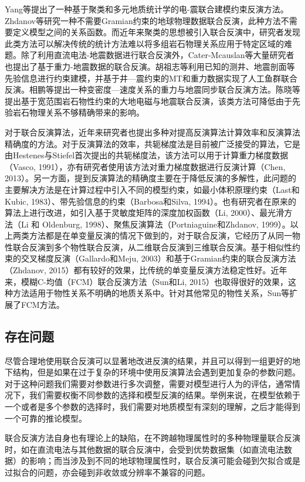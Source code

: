 Yang等提出了一种基于聚类和多元地质统计学的电-震联合建模约束反演方法。Zhdanov等研究一种不需要Gramian约束的地球物理数据联合反演，此种方法不需要定义模型之间的关系函数。而近年来聚类的思想被引入联合反演中，研究者发现此类方法可以解决传统的统计方法难以将多组岩石物理关系应用于特定区域的难题。除了利用直流电法-地震数据进行联合反演外，Cater-Mcauslan等大量研究者也提出了基于重力-地震数据的联合反演。胡祖志等利用已知的测井、地震剖面等先验信息进行约束建模，并基于井—震约束的MT和重力数据实现了人工鱼群联合反演。相鹏等提出一种变密度—速度关系的重力与地震同步联合反演方法。陈晓等提出基于宽范围岩石物性约束的大地电磁与地震联合反演，该类方法可降低由于先验岩石物理关系不够精确带来的影响。

对于联合反演算法，近年来研究者也提出多种对提高反演算法计算效率和反演算法精确度的方法。对于反演算法的效率，共轭梯度法是目前被广泛接受的算法，它是由Hestenes与Stiefel首次提出的共轭梯度法，该方法可以用于计算重力梯度数据（Vasco, 1991），亦有研究者使用该方法对重力梯度数据进行反演计算（Chen, 2013）。另一方面，提到反演算法的精确度主要在于降低反演的多解性，此问题的主要解决方法是在计算过程中引入不同的模型约束，如最小体积原理约束（Last和Kubic, 1983）、带先验信息的约束（Barbosa和Silva, 1994）。也有研究者在原来的算法上进行改进，如引入基于灵敏度矩阵的深度加权函数（Li, 2000）、最光滑方法（Li 和 Oldenburg, 1998）、聚焦反演算法（Portniaguine和Zhdanov, 1999）。以上两类方法都是在单变量反演的情况下做到的，对于联合反演，它经历了从同一物性联合反演到多个物性联合反演，从二维联合反演到三维联合反演。基于相似性约束的交叉梯度反演（Gallardo和Meju, 2003）和基于Gramian约束的联合反演方法（Zhdanov, 2015）都有较好的效果，比传统的单变量反演方法稳定性好。近年来，模糊C-均值（FCM）联合反演方法（Sun和Li, 2015）也取得很好的效果，这种方法适用于物性关系不明确的地质关系中。针对其他常见的物性关系，Sun等扩展了FCM方法。

\subsection{存在问题}

尽管合理地使用联合反演可以显著地改进反演的结果，并且可以得到一组更好的地下结构，但是如果在过于复杂的环境中使用反演算法会遇到更加复杂的参数问题。对于这种问题我们需要对参数进行多次调整，需要对模型进行人为的评估，通常情况下，我们需要权衡不同参数的选择和模型反演的结果。举例来说，在模型依赖于一个或者是多个参数的选择时，我们需要对地质模型有深刻的理解，之后才能得到一个可靠的推论模型。

联合反演方法自身也有理论上的缺陷，在不跨越物理属性时的多种物理量联合反演时，如在直流电法与其他数据的联合反演中，会受到优势数据集（如直流电法数据）的影响；而当涉及到不同的地球物理属性时，联合反演可能会碰到欠拟合或是过拟合的问题，亦会碰到非收敛或分辨率不兼容的问题。

